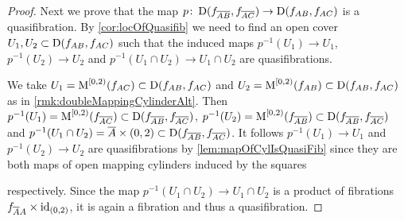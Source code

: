 \begin{prop}
\begin{proof}
        Next we prove that the map $p\colon\operatorname{D}(f_{\overline{A}\overline{B}},f_{\overline{A}\overline{C}})\to\operatorname{D}(f_{AB},f_{AC})$ is a quasifibration.
        By \cref{cor:locOfQuasifib} we need to find an open cover $U_1,U_2\subset\operatorname{D}(f_{AB},f_{AC})$ such that the induced maps $p^{-1}(U_1)\to U_1$, $p^{-1}(U_2)\to U_2$ and $p^{-1}(U_1\cap U_2)\to U_1\cap U_2$ are quasifibrations.

        We take $U_1=\operatorname{M}^{[0,2)}(f_{AC})\subset\operatorname{D}(f_{AB},f_{AC})$ and $U_2=\operatorname{M}^{[0,2)}(f_{AB})\subset\operatorname{D}(f_{AB},f_{AC})$ as in \cref{rmk:doubleMappingCylinderAlt}.
        Then $p^{-1}(U_1)=\operatorname{M}^{[0,2)}(f_{\overline{A}\overline{C}})\subset\operatorname{D}(f_{\overline{A}\overline{B}},f_{\overline{A}\overline{C}})$, $p^{-1}(U_2)=\operatorname{M}^{[0,2)}(f_{\overline{A}\overline{B}})\subset\operatorname{D}(f_{\overline{A}\overline{B}},f_{\overline{A}\overline{C}})$ and $p^{-1}(U_1\cap U_2)=\overline{A}\times (0,2)\subset\operatorname{D}(f_{\overline{A}\overline{B}},f_{\overline{A}\overline{C}})$.
        It follows $p^{-1}(U_1)\to U_1$ and $p^{-1}(U_2)\to U_2$ are quasifibrations by \cref{lem:mapOfCylIsQuasiFib} since they are both maps of open mapping cylinders induced by the squares 
        \begin{center}
        \end{center}
        respectively.
        Since the map $p^{-1}(U_1\cap U_2)\to U_1\cap U_2$ is a product of fibrations $f_{\overline{A}A}\times\text{id}_{(0,2)}$, it is again a fibration and thus a quasifibration.


\end{proof}
\end{prop}
